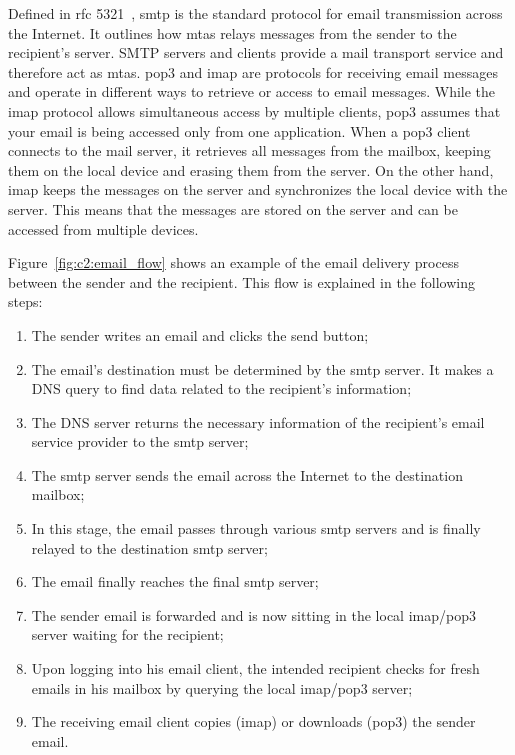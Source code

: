 Defined in \ac{rfc} 5321~\cite{rfc5321}, \ac{smtp} is the standard protocol for email transmission across the Internet. It outlines how \ac{mtas} relays messages from the sender to the recipient's server. SMTP servers and clients provide a mail transport service and therefore act as \ac{mtas}. \ac{pop3} and \ac{imap} are protocols for receiving email messages and operate in different ways to retrieve or access to email messages. While the \ac{imap} protocol allows simultaneous access by multiple clients, \ac{pop3} assumes that your email is being accessed only from one application. When a \ac{pop3} client connects to the mail server, it retrieves all messages from the mailbox, keeping them on the local device and erasing them from the server. On the other hand, \ac{imap} keeps the messages on the server and synchronizes the local device with the server. This means that the messages are stored on the server and can be accessed from multiple devices.


Figure~\ref{fig:c2:email_flow} shows an example of the email delivery process between the sender and the recipient. This flow is explained in the following steps:
\begin{enumerate}
    \item The sender writes an email and clicks the send button;
    \item The email's destination must be determined by the \ac{smtp} server. It makes a DNS query to find data related to the recipient's information;
    \item The DNS server returns the necessary information of the recipient's email service provider to the \ac{smtp} server;
    \item The \ac{smtp} server sends the email across the Internet to the destination mailbox;
    \item In this stage, the email passes through various \ac{smtp} servers and is finally relayed to the destination \ac{smtp} server; 
    \item The email finally reaches the final \ac{smtp} server;
    \item The sender email is forwarded and is now sitting in the local \ac{imap}/\ac{pop3} server waiting for the recipient;
    \item Upon logging into his email client, the intended recipient checks for fresh emails in his mailbox by querying the local \ac{imap}/\ac{pop3} server;
    \item The receiving email client copies (\ac{imap}) or downloads (\ac{pop3}) the sender email. 
\end{enumerate}

